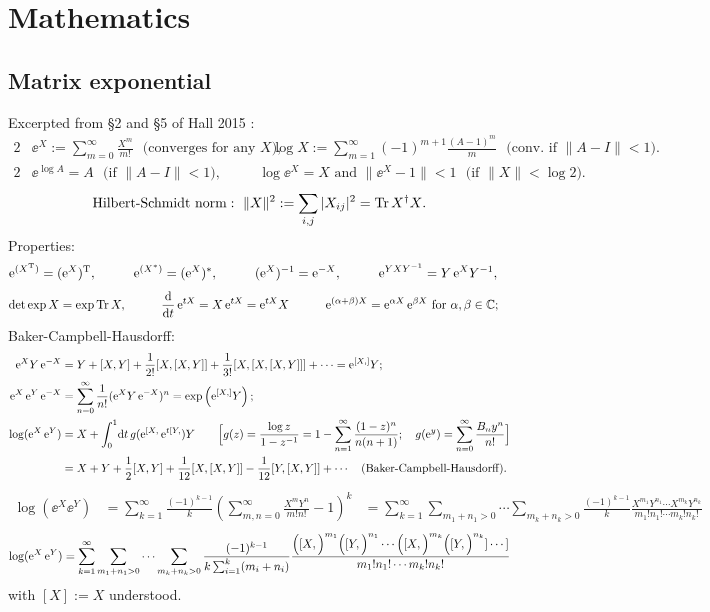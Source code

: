 \documentclass[CheatSheet]{subfiles}
\begin{document}
\detailstyle
\section{Mathematics}
\subsection{Matrix exponential}
Excerpted from \S2 and \S5 of Hall 2015 \cite{hall2015}:
\begin{alignat}{2}
 &\ee^X := \sum_{m=0}^\infty \frac{X^m}{m!} \text{~~(converges for any $X$)},
\quad&
 &\log X := \sum_{m=1}^\infty (-1)^{m+1}\frac{(A-1)^m}{m} \text{~~(conv.~if $\|A-I\|<1$)}.
\end{alignat}
\begin{alignat}{2}
 &\ee^{\log A} = A \text{~~(if $\|A-I\|<1$)},
\quad&
 &\log \ee^X = X \text{~and~} \|\ee^X-1\| < 1 \text{~~(if $\|X\|<\log2$).}
\end{alignat}
\begin{equation}
 \text{Hilbert-Schmidt norm}:~\|X\|^2 := \sum_{i,j}|X_{ij}|^2 = {\operatorname{\mathrm{Tr}} X^\dagger X}.
\end{equation}
Properties:
\begin{alignat*}{4}
 \ee^{(X^\TT)} &= (\ee^X)^\TT,
&\qquad
 \ee^{(X^*)} &= (\ee^X)^*,
&\qquad
 (\ee^X)^{-1} &= \ee^{-X},
&\qquad
 \ee^{YXY^{-1}} &= Y\ee^X Y^{-1},
\end{alignat*}
\begin{alignat*}{3}
 \det \exp X &= \exp\Tr X,
&\qquad
 \frac{\dd}{\dd t}\ee^{tX} &= X\ee^{t X} = \ee^{tX} X
&\qquad
 \ee^{(\alpha+\beta)X} &= \ee^{\alpha X}\ee^{\beta X} \text{~for $\alpha, \beta\in \mathbb C$};
\end{alignat*}
Baker-Campbell-Hausdorff:
\begin{align}
  \ee^X Y \ee^{-X}
&= Y + [X, Y] + \frac1{2!}[X, [X, Y]] + \frac1{3!}[X, [X, [X, Y]]] + \cdots = \ee^{[X,]}Y;
\\
  \ee^X \ee^Y \ee^{-X}
&= \sum_{n=0}^\infty\frac{1}{n!}(\ee^X Y \ee^{-X})^n
 = \exp\left(\ee^{[X,]}Y\right);
\\
  \log(\ee^X \ee^Y)
&= X + \int_0^1\!\dd t\, g(\ee^{[X,}\ee^{t[Y,})Y
\qquad\Bigl[
  g(z) = \frac{\log z}{1-z^{-1}} = 1-\sum_{n=1}^{\infty}\frac{(1-z)^n}{n(n+1)};
\quad
g(\ee^y)=\sum_{n=0}^{\infty}\frac{B_ny^n}{n!}
\Bigr]\\
&= X + Y + \frac12[X,Y] + \frac1{12}[X, [X,Y]] - \frac1{12}[Y, [X,Y]] + \cdots
\quad\text{(Baker-Campbell-Hausdorff).}
\end{align}
\begin{align}
   \log(\ee^X\ee^Y)
&=\sum_{k=1}^\infty \frac{(-1)^{k-1}}{k}\left(\sum_{m,n=0}^{\infty}\frac{X^mY^n}{m!n!}-1\right)^k
&=\sum_{k=1}^\infty
   \sum_{m_1+n_1>0}\cdots\sum_{m_k+n_k>0}\frac{(-1)^{k-1}}{k}
\frac{X^{m_1}Y^{n_1}\cdots X^{m_k}Y^{n_k}}{m_1!n_1!\cdots m_k!n_k!}
\end{align}
\begin{equation}
   \log(\mathop{}\!\mathrm{e}^X\mathop{}\!\mathrm{e}^Y)=\sum_{k=1}^{\infty}\sum_{m_1+n_1>0}\cdots\sum_{m_k+n_k>0}
\frac{(-1)^{k-1}}{k\sum_{i=1}^{k}(m_i+n_i)}
\frac{
\Bigl([X,\Bigr)^{m_1}
\Bigl([Y,\Bigr)^{n_1}\cdots
\Bigl([X,\Bigr)^{m_k}
\Bigl([Y,\Bigr)^{n_k}]\cdots]
}{m_1!n_1!\cdots m_k!n_k!}
\end{equation}
with $[X]:=X$ understood.
\end{document}
